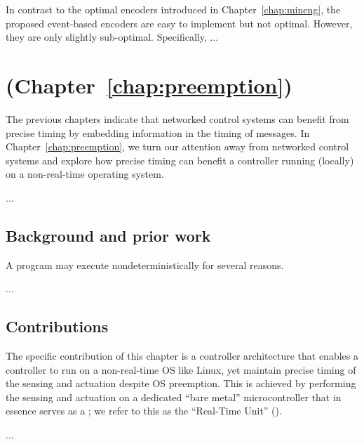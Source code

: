 In contrast to the optimal encoders introduced in Chapter~\ref{chap:mineng},
the proposed event-based encoders are easy to implement but not
optimal. However, they are only slightly sub-optimal. Specifically, ...


\section*{ (Chapter~\ref{chap:preemption})}

The previous chapters indicate that networked control systems can benefit from precise timing by embedding information in the timing of messages. In Chapter~\ref{chap:preemption}, we turn our attention away from networked control systems and explore how precise timing can benefit a controller running (locally) on a non-real-time operating system. 

...


\subsection*{Background and prior work}

A program may execute nondeterministically for several reasons.

...



\subsection*{Contributions}

The specific contribution of this chapter is a controller architecture that
enables a controller to run on a non-real-time OS like Linux, yet
maintain precise timing of the sensing and actuation despite OS
preemption. This is achieved by performing the sensing and actuation
on a dedicated ``bare metal'' microcontroller that in essence serves
as a \rtio{}; we refer to this as the ``Real-Time Unit'' (\RTU{}). 


...




